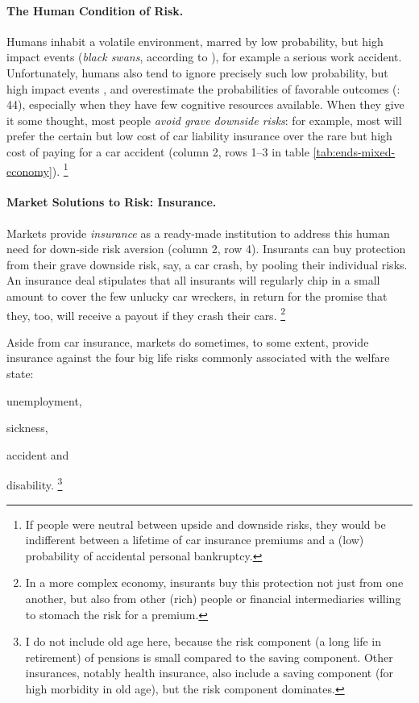 
\paragraph{The Human Condition of Risk.}  \label{sec:human-condition-of-risk}
Humans inhabit a volatile environment, marred by low probability, but high impact events (\emph{black swans}, according to \citealt{Taleb2007}), for example a serious work accident.
Unfortunately, humans also tend to ignore precisely such low probability, but high impact events \citep{Taleb2007}, and overestimate the probabilities of favorable outcomes (\citealt{Baron2000}: 44), especially when they have few cognitive resources available.
When they give it some thought, most people \emph{avoid grave downside risks}:
for example, most will prefer the certain but low cost of car liability insurance over the rare but high cost of paying for a car accident (column 2, rows 1--3 in table \ref{tab:ends-mixed-economy}).
\footnote{
	If people were neutral between upside and downside risks, they would be indifferent between a lifetime of car insurance premiums and a (low) probability of accidental personal bankruptcy.
}

\paragraph{Market Solutions to Risk: Insurance.}  \label{sec:insurance}
Markets provide \emph{insurance} as a ready-made institution to address this human need for down-side risk aversion (column 2, row 4).
Insurants can buy protection from their grave downside risk, say, a car crash, by pooling their individual risks.
An insurance deal stipulates that all insurants will regularly chip in a small amount to cover the few unlucky car wreckers, in return for the promise that they, too, will receive a payout if they crash their cars.
\footnote{
	In a more complex economy, insurants buy this protection not just from one another, but also from other (rich) people or financial intermediaries willing to stomach the risk for a premium.
}

Aside from car insurance, markets do sometimes, to some extent, provide insurance against the four big life risks commonly associated with the welfare state:
\begin{inparaenum}[1)]
	\item unemployment,
	\item sickness,
	\item accident and
	\item disability.
	\footnote{
		I do not include old age here, because the risk component (a long life in retirement) of pensions is small compared to the saving component.
		Other insurances, notably health insurance, also include a saving component (for high morbidity in old age), but the risk component dominates.
	}
\end{inparaenum}

